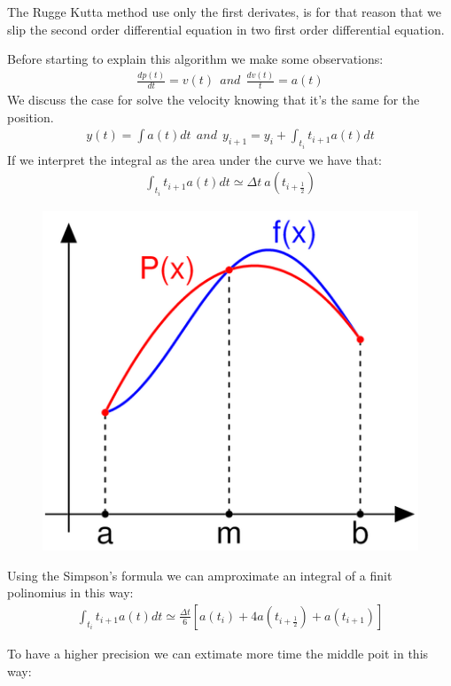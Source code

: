 \documentclass[a4paper]{article}
\begin{document}
The Rugge Kutta method use only the first derivates, is for that reason that we slip the second order differential equation in two first order differential equation. 

Before starting to explain this algorithm we make some observations: 
\begin{align}
\frac{dp(t)}{dt} = v(t) \ \ and \ \ \frac{dv(t)}{t} = a(t) 
\end{align}
We discuss the case for solve the velocity knowing that it's the same for the position.
\begin{align}
y(t) = \int a(t)dt \ \ and \  \ y_{i+1} = y_i + \int_{t_i}{t_{i+1}} a(t)dt
\end{align}
If we interpret the integral as the area under the curve we have that:
\begin{align}
\int_{t_i}{t_{i+1}} a(t)dt \simeq \Delta t \  a(t_{i+\frac{1}{2}})
\end{align}

\begin{figure}
\includegraphics[scale=0.3]{sim_int.png}
\end{figure}

Using the Simpson's formula we can amproximate an integral of a finit polinomius in this way: 
\begin{align}
\int_{t_i}{t_{i+1}} a(t)dt \simeq \frac{\Delta t}{6} \left [ a(t_i)+4a(t_{i+\frac{1}{2}})+ a(t_{i+1}) \right ] 
\end{align}

To have a higher precision we can extimate more time the middle poit in this way:
\end{document}
